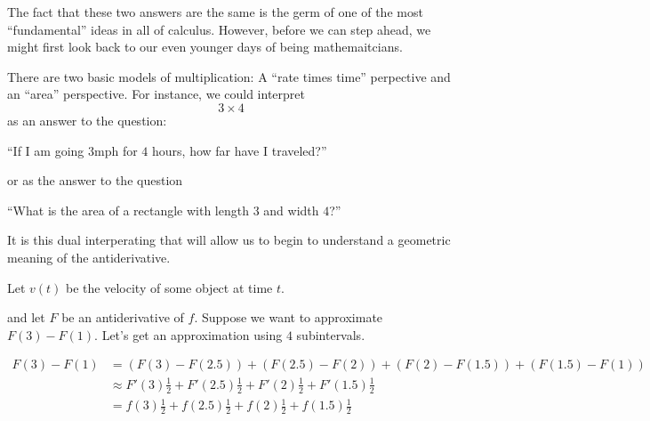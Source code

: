 \documentclass{ximera}
\begin{document}
The fact that these two answers are the same is the germ of one of the
most ``fundamental'' ideas in all of calculus. However, before we can
step ahead, we might first look back to our even younger days of being mathemaitcians.

  There are two basic models of multiplication: A ``rate times time''
  perpective and an ``area'' perspective.  For instance, we could
  interpret
  \[
  3\times 4
  \]
  as an answer to the question:
  \begin{center}
    ``If I am going $3 \textrm{mph}$ for $4$ hours, how far have I
    traveled?''
  \end{center}
  or as the answer to the question
  \begin{center}
    ``What is the area of a rectangle with length $3$ and width $4$?''
  \end{center}

It is this dual interperating that will allow us to begin to
understand a geometric meaning of the antiderivative.

Let $v(t)$ be the velocity of some object at time $t$.
\begin{image}
\end{image}
and let $F$ be an antiderivative of $f$.  Suppose we want to approximate $F(3)
- F(1)$.  Let's get an approximation using $4$ subintervals.

  \begin{align*}F(3) - F(1) &= (F(3) - F(2.5))+(F(2.5) - F(2))+(F(2) - F(1.5))+(F(1.5) - F(1))\\
  &\approx F'(3)\frac{1}{2}+F'(2.5)\frac{1}{2}+F'(2)\frac{1}{2}+F'(1.5)\frac{1}{2}\\
  &=f(3)\frac{1}{2}+f(2.5)\frac{1}{2}+f(2)\frac{1}{2}+f(1.5)\frac{1}{2}
  \end{align*}
\end{document}
